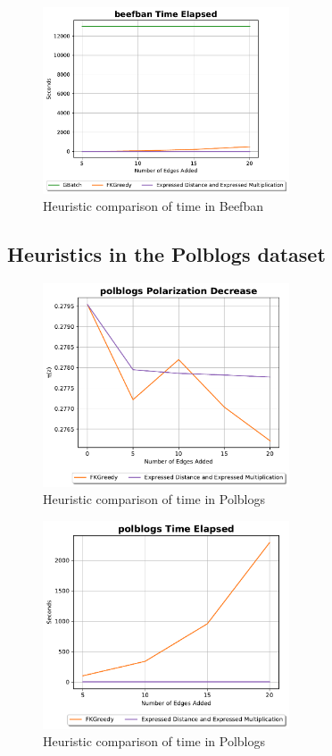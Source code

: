 \begin{figure}[!htbp]
	\centering
	\includegraphics[width=0.65\textwidth]{Figures/Beefban Time Elapsed}
	\caption{Heuristic comparison of time in Beefban}
	\label{fig:beefban_time}
\end{figure}

\clearpage

\subsection{Heuristics in the Polblogs dataset}

\begin{figure}[!htbp]
	\centering
	\includegraphics[width=0.65\textwidth]{Figures/polblogs Polarization Decrease}
	\caption{Heuristic comparison of time in Polblogs}
	\label{fig:polblogs_pol}
\end{figure}


\begin{figure}[!htbp]
	\centering
	\includegraphics[width=0.65\textwidth]{Figures/Polblogs Time Elapsed}
	\caption{Heuristic comparison of time in Polblogs}
	\label{fig:polblogs_time}
\end{figure}

